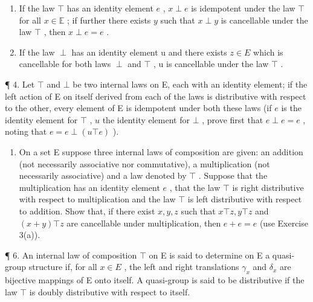\begin{enumerate}
\def\labelenumi{(\alph{enumi})}
\item
  If the law \(\top\) has an identity element \(e\) , \(x \perp e\) is idempotent under the law \(\top\) for all \(x \in \mathbb{E}\) ; if further there exists \(y\) such that \(x \perp y\) is cancellable under the law \(\top\) , then \(x \perp e = e\) .
\item
  If the law \(\perp\) has an identity element u and there exists \(z \in E\) which is cancellable for both laws \(\perp\) and \(\top\) , u is cancellable under the law \(\top\) .
\end{enumerate}

¶ 4. Let \(\top\) and \(\bot\) be two internal laws on E, each with an identity element; if the left action of E on itself derived from each of the laws is distributive with respect to the other, every element of E is idempotent under both these laws (if \(e\) is the identity element for \(\top\) , \(u\) the identity element for \(\bot\) , prove first that \(e \perp e = e\) , noting that \(e = e \perp (u \top e)\) ).

\begin{enumerate}
\def\labelenumi{\arabic{enumi}.}
\setcounter{enumi}{4}
\tightlist
\item
  On a set E suppose three internal laws of composition are given: an addition (not necessarily associative nor commutative), a multiplication (not necessarily associative) and a law denoted by \(\top\) . Suppose that the multiplication has an identity element \(e\) , that the law \(\top\) is right distributive with respect to multiplication and the law \(\top\) is left distributive with respect to addition. Show that, if there exist \(x, y, z\) such that \(x \top z, y \top z\) and \((x + y) \top z\) are cancellable under multiplication, then \(e + e = e\) (use Exercise 3(a)).
\end{enumerate}

¶ 6. An internal law of composition \(\top\) on E is said to determine on E a quasi-group structure if, for all \(x \in E\) , the left and right translations \(\gamma_x\) and \(\delta_x\) are bijective mappings of E onto itself. A quasi-group is said to be distributive if the law \(\top\) is doubly distributive with respect to itself.

